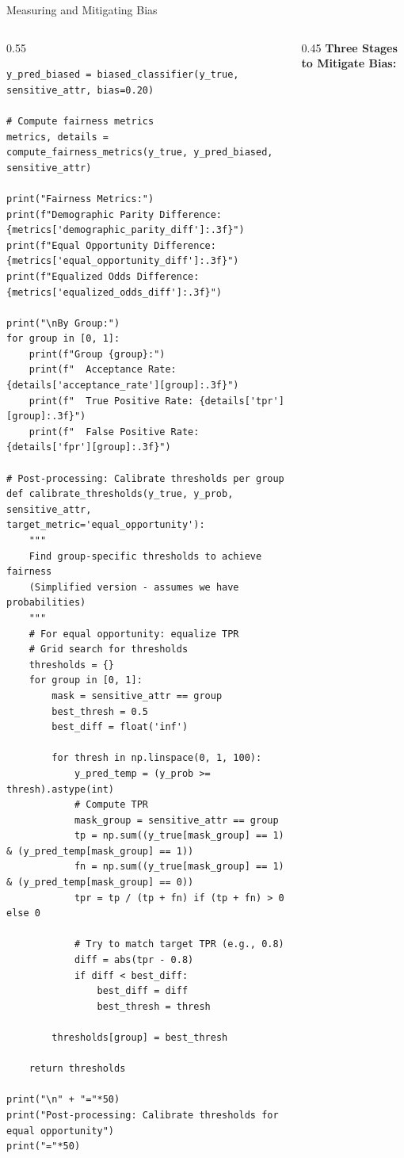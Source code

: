 \begin{frame}[fragile]{Measuring and Mitigating Bias}
\begin{columns}
\begin{column}{0.55\textwidth}
\begin{lstlisting}[basicstyle=\ttfamily\tiny]
y_pred_biased = biased_classifier(y_true, sensitive_attr, bias=0.20)

# Compute fairness metrics
metrics, details = compute_fairness_metrics(y_true, y_pred_biased, sensitive_attr)

print("Fairness Metrics:")
print(f"Demographic Parity Difference: {metrics['demographic_parity_diff']:.3f}")
print(f"Equal Opportunity Difference: {metrics['equal_opportunity_diff']:.3f}")
print(f"Equalized Odds Difference: {metrics['equalized_odds_diff']:.3f}")

print("\nBy Group:")
for group in [0, 1]:
    print(f"Group {group}:")
    print(f"  Acceptance Rate: {details['acceptance_rate'][group]:.3f}")
    print(f"  True Positive Rate: {details['tpr'][group]:.3f}")
    print(f"  False Positive Rate: {details['fpr'][group]:.3f}")

# Post-processing: Calibrate thresholds per group
def calibrate_thresholds(y_true, y_prob, sensitive_attr, target_metric='equal_opportunity'):
    """
    Find group-specific thresholds to achieve fairness
    (Simplified version - assumes we have probabilities)
    """
    # For equal opportunity: equalize TPR
    # Grid search for thresholds
    thresholds = {}
    for group in [0, 1]:
        mask = sensitive_attr == group
        best_thresh = 0.5
        best_diff = float('inf')

        for thresh in np.linspace(0, 1, 100):
            y_pred_temp = (y_prob >= thresh).astype(int)
            # Compute TPR
            mask_group = sensitive_attr == group
            tp = np.sum((y_true[mask_group] == 1) & (y_pred_temp[mask_group] == 1))
            fn = np.sum((y_true[mask_group] == 1) & (y_pred_temp[mask_group] == 0))
            tpr = tp / (tp + fn) if (tp + fn) > 0 else 0

            # Try to match target TPR (e.g., 0.8)
            diff = abs(tpr - 0.8)
            if diff < best_diff:
                best_diff = diff
                best_thresh = thresh

        thresholds[group] = best_thresh

    return thresholds

print("\n" + "="*50)
print("Post-processing: Calibrate thresholds for equal opportunity")
print("="*50)
\end{lstlisting}
\end{column}
\begin{column}{0.45\textwidth}
\textbf{Three Stages to Mitigate Bias:}


\end{column}
\end{columns}
\end{frame}
